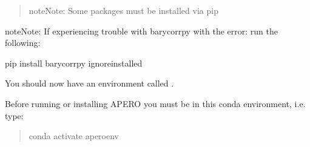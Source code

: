 \documentclass[a4paper,10pt,english]{report}
\begin{document}
\begin{enumerate}
\begin{quote}
\begin{sphinxadmonition}{note}{Note:}
Some packages must be installed via pip
\end{sphinxadmonition}

\begin{sphinxVerbatim}[commandchars=\\\{\}]
  
  
\end{sphinxVerbatim}
\end{quote}

\end{enumerate}

\begin{sphinxadmonition}{note}{Note:}
If experiencing trouble with barycorrpy with the error:
 run the following:

\begin{sphinxVerbatim}[commandchars=\\\{\}]
pip install barycorrpy \PYGZhy{}\PYGZhy{}ignore\PYGZhy{}installed
\end{sphinxVerbatim}
\end{sphinxadmonition}

You should now have an environment called .

Before running or installing APERO you must be in this conda environment, i.e. type:
\begin{quote}

\begin{sphinxVerbatim}[commandchars=\\\{\}]
conda activate apero\PYGZhy{}env
\end{sphinxVerbatim}
\end{quote}
\end{document}
